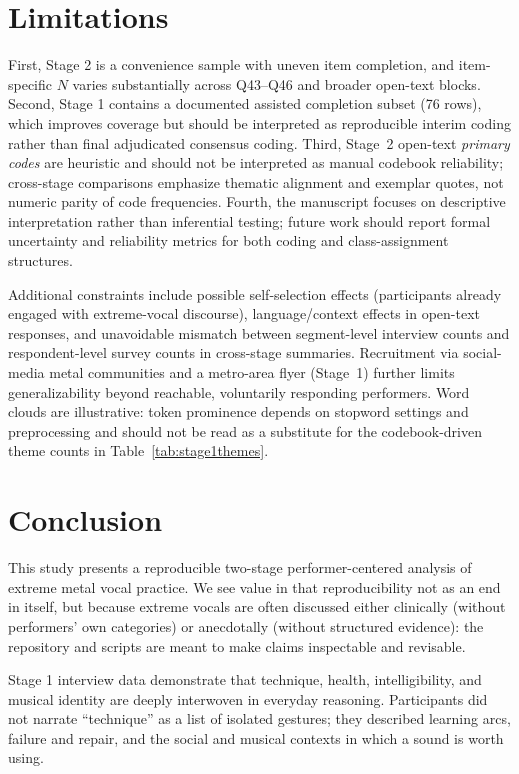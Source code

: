 \documentclass{article}
\begin{document}
\section{Limitations}
First, Stage 2 is a convenience sample with uneven item completion, and item-specific \(N\) varies substantially across Q43--Q46 and broader open-text blocks.
Second, Stage 1 contains a documented assisted completion subset (76 rows), which improves coverage but should be interpreted as reproducible interim coding rather than final adjudicated consensus coding.
Third, Stage~2 open-text \emph{primary codes} are heuristic and should not be interpreted as manual codebook reliability; cross-stage comparisons emphasize thematic alignment and exemplar quotes, not numeric parity of code frequencies.
Fourth, the manuscript focuses on descriptive interpretation rather than inferential testing; future work should report formal uncertainty and reliability metrics for both coding and class-assignment structures.

Additional constraints include possible self-selection effects (participants already engaged with extreme-vocal discourse), language/context effects in open-text responses, and unavoidable mismatch between segment-level interview counts and respondent-level survey counts in cross-stage summaries.
Recruitment via social-media metal communities and a metro-area flyer (Stage~1) further limits generalizability beyond reachable, voluntarily responding performers.
Word clouds are illustrative: token prominence depends on stopword settings and preprocessing and should not be read as a substitute for the codebook-driven theme counts in Table~\ref{tab:stage1themes}.

\section{Conclusion}
This study presents a reproducible two-stage performer-centered analysis of extreme metal vocal practice.
We see value in that reproducibility not as an end in itself, but because extreme vocals are often discussed either clinically (without performers' own categories) or anecdotally (without structured evidence): the repository and scripts are meant to make claims inspectable and revisable.

Stage 1 interview data demonstrate that technique, health, intelligibility, and musical identity are deeply interwoven in everyday reasoning.
Participants did not narrate ``technique'' as a list of isolated gestures; they described learning arcs, failure and repair, and the social and musical contexts in which a sound is worth using.
\end{document}
